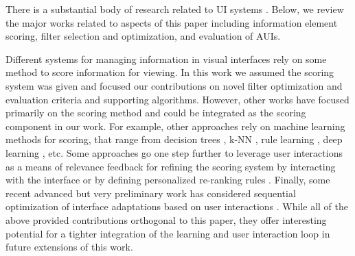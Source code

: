 

There is a substantial body of research related to UI systems \cite{Dumais2016,Seiji2001,Inibhunu2016}. %
Below, we review the major works related to aspects of this paper including information element scoring, filter selection and optimization, and evaluation of AUIs.


 Different systems for managing information in visual interfaces rely on some method to score information for viewing.  In this work we assumed the scoring system was given and focused our contributions on novel filter optimization and evaluation criteria and supporting algorithms.  However, other works have focused primarily on the scoring method and could be integrated as the scoring component in our work.  For example, other approaches rely on machine learning methods for scoring, that range from decision trees \cite{Cui2008b}, k-NN \cite{Amershi2011}, rule learning \cite{Mezhoudi2013}, deep learning \cite{Harold2017}, etc.  
Some approaches go one step further to leverage user interactions as a means of relevance feedback for refining the scoring system by interacting with the interface \cite{Harold2017,Schrier2008}  or by defining personalized re-ranking rules 
\cite{Fogarty2008}.
Finally, some recent advanced but very preliminary work has considered sequential optimization of interface adaptations based on user interactions \cite{Harold2017}.  While all of the above provided contributions orthogonal to this paper, they offer interesting potential for a tighter integration of the learning and user interaction loop in future extensions of this work.



